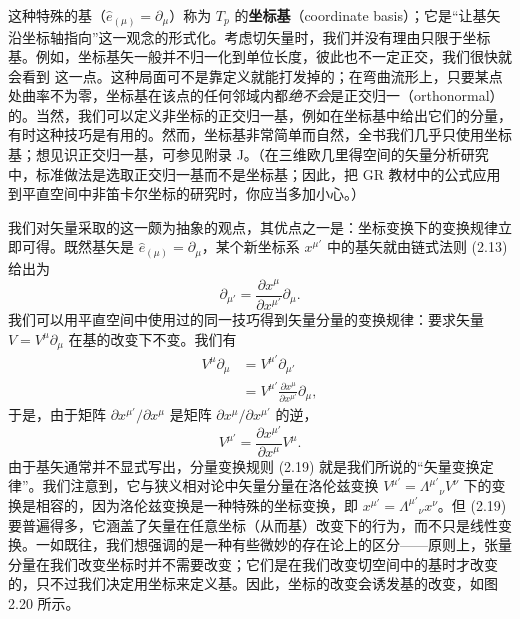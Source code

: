 这种特殊的基（$\hat{e}_{(\mu)}=\partial_\mu$）称为 $T_p$ 的\textbf{坐标基}（coordinate basis）；它是“让基矢沿坐标轴指向”这一观念的形式化。考虑切矢量时，我们并没有理由只限于坐标基。例如，坐标基矢一般并不归一化到单位长度，彼此也不一定正交，我们很快就会看到
这一点。这种局面可不是靠定义就能打发掉的；在弯曲流形上，只要某点处曲率不为零，坐标基在该点的任何邻域内都\emph{绝不会}是正交归一（orthonormal）的。当然，我们可以定义非坐标的正交归一基，例如在坐标基中给出它们的分量，有时这种技巧是有用的。然而，坐标基非常简单而自然，全书我们几乎只使用坐标基；想见识正交归一基，可参见附录 J。（在三维欧几里得空间的矢量分析研究中，标准做法是选取正交归一基而不是坐标基；因此，把 GR 教材中的公式应用到平直空间中非笛卡尔坐标的研究时，你应当多加小心。）

我们对矢量采取的这一颇为抽象的观点，其优点之一是：坐标变换下的变换规律立即可得。既然基矢是 $\hat{e}_{(\mu)}=\partial_\mu$，某个新坐标系 $x^{\mu'}$ 中的基矢就由链式法则 (2.13) 给出为
\begin{equation*}
\partial_{\mu'}=\frac{\partial x^\mu}{\partial x^{\mu'}}\partial_\mu. \tag{2.17}
\end{equation*}
我们可以用平直空间中使用过的同一技巧得到矢量分量的变换规律：要求矢量 $V=V^\mu\partial_\mu$ 在基的改变下不变。我们有
\begin{align*}
V^\mu\partial_\mu&=V^{\mu'}\partial_{\mu'}\\
&=V^{\mu'}\frac{\partial x^\mu}{\partial x^{\mu'}}\partial_\mu, \tag{2.18}
\end{align*}
于是，由于矩阵 $\partial x^{\mu'}/\partial x^\mu$ 是矩阵 $\partial x^\mu/\partial x^{\mu'}$ 的逆，
\begin{equation*}
V^{\mu'}=\frac{\partial x^{\mu'}}{\partial x^\mu}V^\mu. \tag{2.19}
\end{equation*}
由于基矢通常并不显式写出，分量变换规则 (2.19) 就是我们所说的“矢量变换定律”。我们注意到，它与狭义相对论中矢量分量在洛伦兹变换 $V^{\mu'}=\Lambda^{\mu'}{}_\nu V^\nu$ 下的变换是相容的，因为洛伦兹变换是一种特殊的坐标变换，即 $x^{\mu'}=\Lambda^{\mu'}{}_\nu x^\nu$。但 (2.19) 要普遍得多，它涵盖了矢量在任意坐标（从而基）改变下的行为，而不只是线性变换。一如既往，我们想强调的是一种有些微妙的存在论上的区分——原则上，张量分量在我们改变坐标时并不需要改变；它们是在我们改变切空间中的基时才改变的，只不过我们决定用坐标来定义基。因此，坐标的改变会诱发基的改变，如图 2.20 所示。

